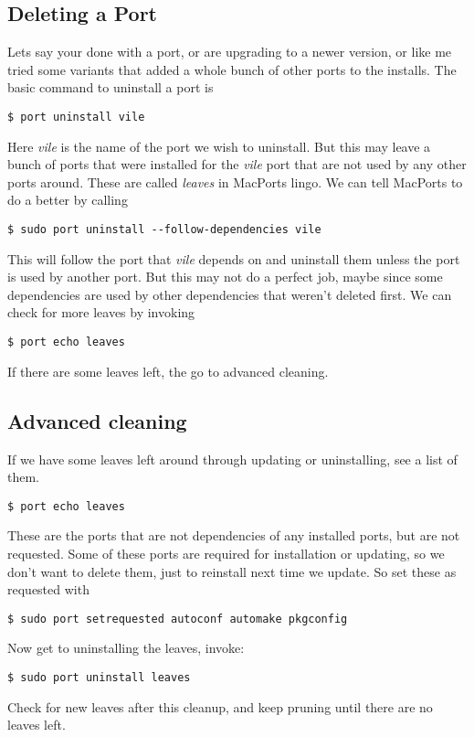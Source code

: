 \documentclass[11pt]{article}
\begin{document}
\subsection{Deleting a Port}
Lets say your done with a port, or are upgrading to a newer version, or like me tried some variants that added a whole bunch of other ports to the installs. The basic command to uninstall a port is 
\begin{lstlisting}[style=Bash]
$ port uninstall vile
\end{lstlisting}
Here \textit{vile} is the name of the port we wish to uninstall. But this may leave a bunch of ports that were installed for the \textit{vile} port that are not used by any other ports around. These are called \textit{leaves} in MacPorts lingo. We can tell MacPorts to do a better by calling
\begin{lstlisting}[style=Bash]
$ sudo port uninstall --follow-dependencies vile
\end{lstlisting}
This will follow the port that {\it vile} depends on and uninstall them unless the port is used by another port. But this may not do a perfect job, maybe since some dependencies are used by other dependencies that weren't deleted first. We can check for more leaves by invoking
\begin{lstlisting}[style=Bash]
$ port echo leaves
\end{lstlisting}
If there are some leaves left, the go to advanced cleaning.


\subsection{Advanced cleaning}
If we have some leaves left around through updating or uninstalling, see a list of them.
\begin{lstlisting}[style=Bash]
$ port echo leaves
\end{lstlisting}
These are the ports that are not dependencies of any installed ports, but are not requested. Some of these ports are required for installation or updating, so we don't want to delete them, just to reinstall next time we update. So set these as requested with
\begin{lstlisting}[style=Bash]
$ sudo port setrequested autoconf automake pkgconfig
\end{lstlisting}

Now get to uninstalling the leaves, invoke:
\begin{lstlisting}[style=Bash]
$ sudo port uninstall leaves
\end{lstlisting}
Check for new leaves after this cleanup, and keep pruning until there are no leaves left.
\end{document}
